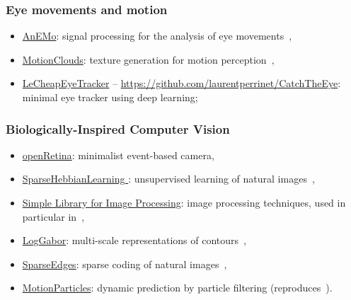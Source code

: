 \documentclass[10pt,english,a4paper,oneside]{article}%
\begin{document}
\subsubsection{Eye movements and motion} %
\begin{itemize}

	\item \href{https://github.com/invibe/AnEMo}{AnEMo}: signal processing for the analysis of eye movements~\citep{Pasturel18anemo},
	\item \href{http://github.com/NeuralEnsemble/MotionClouds}{MotionClouds}: texture generation for motion perception~\citep{Sanz12,Vacher15nips,Vacher16},
	\item \href{https://github.com/laurentperrinet/LeCheapEyeTracker}{LeCheapEyeTracker} -- \url{https://github.com/laurentperrinet/CatchTheEye}: minimal eye tracker using deep learning;
\end{itemize}



\subsubsection{Biologically-Inspired Computer Vision} %
\begin{itemize}
	\item \href{https://github.com/laurentperrinet/openRetina}{openRetina}: minimalist event-based camera,
	\item \href{http://github.com/bicv/SparseHebbianLearning }{SparseHebbianLearning }: unsupervised learning of natural images~\citep{Perrinet10shl,Perrinet19hulk},
	\item \href{http://github.com/bicv/SLIP}{Simple Library for Image Processing}: image processing techniques, used in particular in~\citep{Perrinet15bicv,Ravello16droplets,PerrinetBednar15,Perrinet15eusipco,Perrinet16EUVIP},
	\item \href{http://github.com/bicv/LogGabor}{LogGabor}: multi-scale representations of contours~\citep{Fischer07,Fischer07cv},
	\item \href{http://github.com/bicv/SparseEdges}{SparseEdges}: sparse coding of natural images~\citep{Perrinet15bicv,PerrinetBednar15},
	\item \href{https://github.com/laurentperrinet/Khoei_2017_PLoSCB}{MotionParticles}: dynamic prediction by particle filtering (reproduces~\citep{Perrinet12pred,Khoei13jpp,KhoeiMassonPerrinet17}).
\end{itemize}
\end{document}
